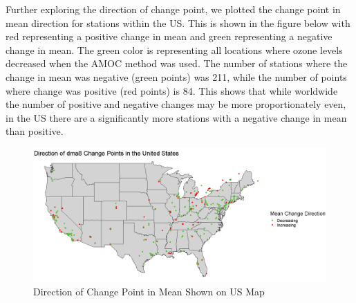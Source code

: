 \documentclass[11pt, oneside]{article}
\theoremstyle{definition}
\begin{document}
Further exploring the direction of change point, we plotted the change point in mean direction for stations within the US. This is shown in the figure below with red representing a positive change in mean and green representing a negative change in mean. The green color is representing all locations where ozone levels decreased when the AMOC method was used. The number of stations where the change in mean was negative (green points) was 211, while the number of points where change was positive (red points) is 84. This shows that while worldwide the number of positive and negative changes may be more proportionately even, in the US there are a significantly more stations with a negative change in mean than positive.  

\begin{figure}[H]
    \centering
    \includegraphics[width=0.7\linewidth]{plots/direction_change_point_US_pretty.png}
    \caption{Direction of Change Point in Mean Shown on US Map}
    \label{amoc_geo_dir}
\end{figure}
\end{document}
